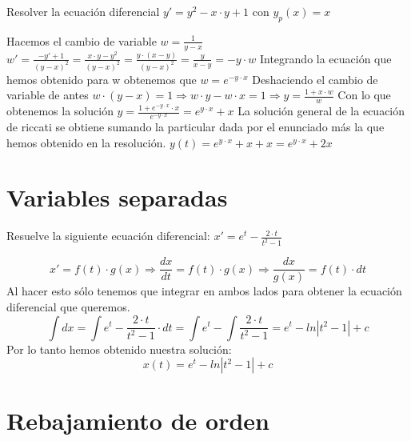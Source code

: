 \begin{ejer}
	Resolver la ecuación diferencial $y' = y^2 - x\cdot y + 1$ con $y_p(x) =x$
\end{ejer}
\begin{sol}
	Hacemos el cambio de variable $w = \frac{1}{y-x}$  
	$w' = \frac{-y' + 1}{(y-x)^2} = \frac{x\cdot y - y^2}{(y-x)^2} = \frac{y\cdot (x-y)}{(y-x)^2} = \frac{y}{x-y} = -y\cdot w$  
	Integrando la ecuación que hemos obtenido para w obtenemos que $w = e^{-y\cdot x}$  
	Deshaciendo el cambio de variable de antes
	$w\cdot (y-x) = 1 \Rightarrow w\cdot y - w\cdot x = 1 \Rightarrow y = \frac{1+x\cdot w}{w}$  
	Con lo que obtenemos la solución $y = \frac{1+e^{-y\cdot x}\cdot x}{e^{-y\cdot x}} = e^{y\cdot x} + x$  
	La solución general de la ecuación de riccati se obtiene sumando la particular dada por el enunciado más la que hemos obtenido en la resolución.  
	$y(t) = e^{y\cdot x} + x + x = e^{y\cdot x} + 2x$
\end{sol}


\section{Variables separadas}

\begin{ejer}
	Resuelve la siguiente ecuación diferencial:  
	$x' = e^t - \frac{2\cdot t}{t^2-1}$ 
\end{ejer}
\begin{sol}
	$$x' = f(t)\cdot g(x) \Rightarrow \frac{dx}{dt} = f(t)\cdot g(x) \Rightarrow \frac{dx}{g(x)} = f(t)\cdot dt$$  
	Al hacer esto sólo tenemos que integrar en ambos lados para obtener la ecuación diferencial que queremos.  
	$$\int dx = \int e^t - \frac{2\cdot t}{t^2-1}\cdot dt = \int e^t - \int \frac{2\cdot t}{t^2-1} = e^t - ln|t^2-1| + c$$  
	Por lo tanto hemos obtenido nuestra solución:  
	$$x(t) = e^t - ln|t^2-1| + c$$
\end{sol}


\section{Rebajamiento de orden}

